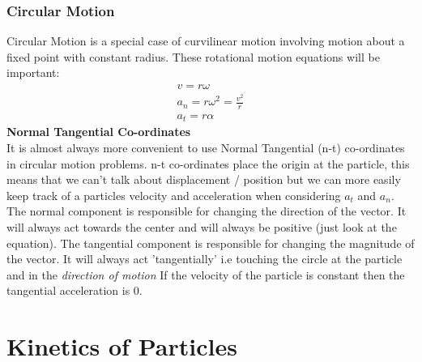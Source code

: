 \documentclass[a4paper, 12pt]{article}
\begin{document}
\subsubsection*{Circular Motion}
Circular Motion is a special case of curvilinear motion involving motion about a fixed point with constant radius. These rotational motion equations will be important:
\begin{align}
    v = r\omega \\
    a_n = r \omega^2 = \frac{v^2}{r} \\
    a_t = r\alpha 
\end{align}
\textbf{Normal Tangential Co-ordinates}
\\
\noindent
It is almost always more convenient to use Normal Tangential (n-t) co-ordinates in circular motion problems.
n-t co-ordinates place the origin at the particle, this means that we can't talk about displacement / position but
we can more easily keep track of a particles velocity and acceleration when considering $a_t$ and $a_n$.
\noindent
The normal component is responsible for changing the direction of the vector. 
It will always act towards the center and will always be positive (just look at the equation).
The tangential component is responsible for changing the magnitude of the vector. 
It will always act 'tangentially' i.e touching the circle at the particle and in the \textit{direction of motion}
If the velocity of the particle is constant then the tangential acceleration is 0.

\section{Kinetics of Particles}
\end{document}
